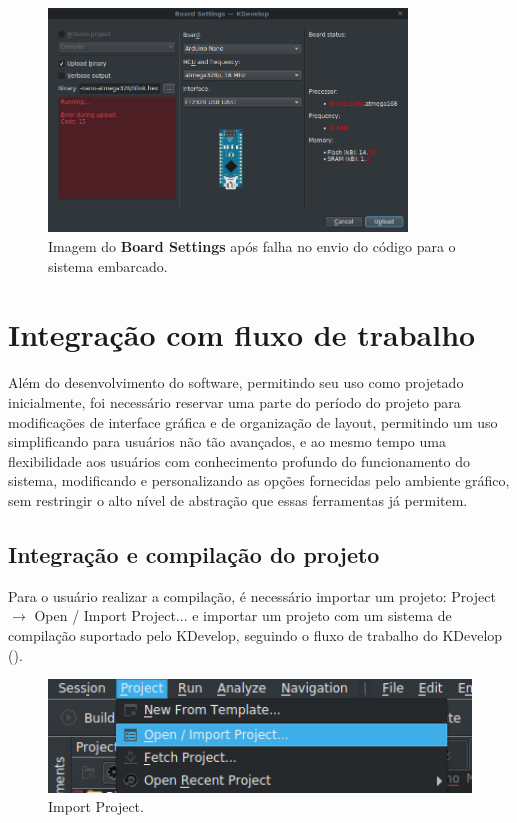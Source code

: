 \begin{figure}[!htb]
  \centering
  \includegraphics[width=0.85\textwidth]{figuras/boardsettingsndone.png}
  \caption[Board Settings com falha no envio]{Imagem do \textbf{Board Settings} após falha no envio do código para o sistema embarcado.}
  \label{fig:boardsettingsndone}
\end{figure}

\section{Integração com fluxo de trabalho}
Além do desenvolvimento do software, permitindo seu uso como projetado inicialmente, foi necessário reservar uma parte do período do projeto para modificações de interface gráfica e de organização de layout, permitindo um uso simplificando para usuários não tão avançados, e ao mesmo tempo uma flexibilidade aos usuários com conhecimento profundo do funcionamento do sistema, modificando e personalizando as opções fornecidas pelo ambiente gráfico, sem restringir o alto nível de abstração que essas ferramentas já permitem.

\subsection{Integração e compilação do projeto}

Para o usuário realizar a compilação, é necessário importar um projeto: Project $\rightarrow$ Open / Import Project... e importar um projeto com um sistema de compilação suportado pelo KDevelop, seguindo o fluxo de trabalho do KDevelop ().

\begin{figure}[!htb]
  \centering
  \includegraphics[width=1\textwidth]{figuras/importproject.png}
  \caption[Import Project]{Import Project.}
  \label{fig:importproject}
\end{figure}

